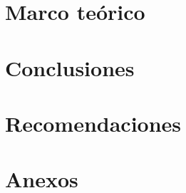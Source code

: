 \documentclass[11pt, letterpaper, twoside, openright]{report}
\newcommand{\defaultparformat}[1]{
	{\setlength{\parskip}{2ex}
     }
}
\begin{document}
\ifdefined\CAPmarcoteorico
	\newpage
	\chapter{Marco teórico}
	\ifdefined\parpordefecto
		\defaultparformat{var/agent_runs/teoria-visual/i-marco-ampliado}
	\else
		
	\fi
\fi

\newpage
\ifdefined\parpordefecto
	\defaultparformat{j-capitulos}
\else
	
\fi

\ifdefined\CAPconclusiones
	\newpage
	\chapter{Conclusiones}
	\ifdefined\parpordefecto
		\defaultparformat{k-conclusiones}
	\else
		
	\fi
\fi

\ifdefined\CAPrecomendaciones
	\newpage
	\chapter{Recomendaciones}
	\ifdefined\parpordefecto
		\defaultparformat{l-recomendaciones}
	\else
		
	\fi
\fi

\ifdefined\CAPbibliografia
	\newpage
    \cleardoublepage{}
	\chapter{\bibname}
    \printbibliography[heading=none]
\fi

\ifdefined\CAPanexos
	\newpage
	\chapter{Anexos}
	\ifdefined\parpordefecto
		\defaultparformat{n-anexos}
	\else
		
	\fi
\fi

\ifdefined\CAPglosario
	\newpage
	\printglossary
\fi
\end{document}
